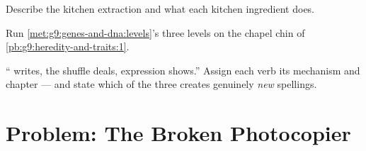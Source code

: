 \begin{exercise}[$\star\star$]\label{exo:g9:genes-and-dna:10}
Describe the kitchen extraction and what each kitchen
ingredient does.
\end{exercise}

\begin{exercise}[$\star\star$]\label{exo:g9:genes-and-dna:11}
Run \cref{met:g9:genes-and-dna:levels}'s three levels on
the chapel chin of \cref{pb:g9:heredity-and-traits:1}.
\end{exercise}

\begin{exercise}[$\star\star\star$]\label{exo:g9:genes-and-dna:12}
`` writes, the shuffle deals, expression shows.''
Assign each verb its mechanism and chapter --- and state
which of the three creates genuinely \emph{new}
spellings.
\end{exercise}

\section{Problem: The Broken Photocopier}

